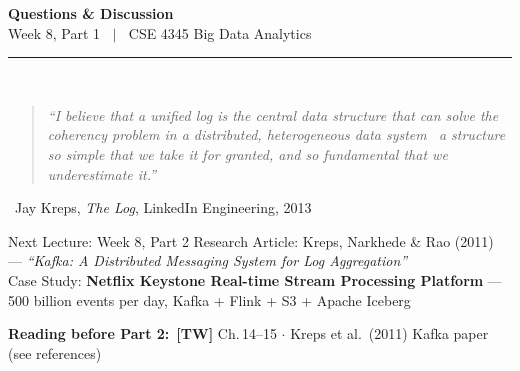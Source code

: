 \documentclass[aspectratio=169,10pt]{beamer}
\begin{document}
\begin{frame}[c]
  \begin{center}
    {\Large\bfseries Questions \& Discussion}\\[10pt]
    {\large Week 8, Part 1 $\;\mid\;$ CSE 4345 Big Data Analytics}\\[8pt]
    \textcolor{PUGray}{\rule{7cm}{0.5pt}}\\[10pt]
    \begin{quote}
      \itshape ``I believe that a unified log is the central data structure that can solve the coherency problem in a distributed, heterogeneous data system \textemdash\ a structure so simple that we take it for granted, and so fundamental that we underestimate it.''
    \end{quote}
    \hfill\textemdash\ Jay Kreps, \textit{The Log}, LinkedIn Engineering, 2013
    \vspace{12pt}
    \begin{block}{\centering Next Lecture: Week 8, Part 2}
      \centering
      Research Article: Kreps, Narkhede \& Rao (2011) --- \textit{``Kafka: A Distributed Messaging System for Log Aggregation''}\\[4pt]
      \small Case Study: \textbf{Netflix Keystone Real-time Stream Processing Platform} ---
      500 billion events per day, Kafka + Flink + S3 + Apache Iceberg
    \end{block}
    \vspace{6pt}
    \textbf{Reading before Part 2:}\ \textbf{[TW]} Ch.\,14--15 $\cdot$ Kreps et al.\ (2011) Kafka paper (see references)
  \end{center}
\end{frame}

\end{document}
